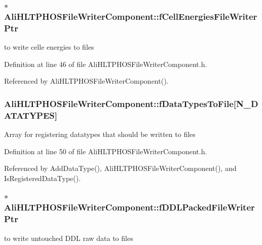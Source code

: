 \subsubsection{$\ast$ {\bf Ali\-HLTPHOSFile\-Writer\-Component::f\-Cell\-Energies\-File\-Writer\-Ptr}\hspace{0.3cm}{\tt  [private]}}\label{classAliHLTPHOSFileWriterComponent_r0}


to write celle energies to files 

Definition at line 46 of file Ali\-HLTPHOSFile\-Writer\-Component.h.

Referenced by Ali\-HLTPHOSFile\-Writer\-Component().
\subsubsection{ {\bf Ali\-HLTPHOSFile\-Writer\-Component::f\-Data\-Types\-To\-File}[N\_\-DATATYPES]\hspace{0.3cm}{\tt  [private]}}\label{classAliHLTPHOSFileWriterComponent_r4}


Array for registering datatypes that should be written to files 

Definition at line 50 of file Ali\-HLTPHOSFile\-Writer\-Component.h.

Referenced by Add\-Data\-Type(), Ali\-HLTPHOSFile\-Writer\-Component(), and Is\-Registered\-Data\-Type().
\subsubsection{$\ast$ {\bf Ali\-HLTPHOSFile\-Writer\-Component::f\-DDLPacked\-File\-Writer\-Ptr}\hspace{0.3cm}{\tt  [private]}}\label{classAliHLTPHOSFileWriterComponent_r1}


to write untouched DDL raw data to files 


